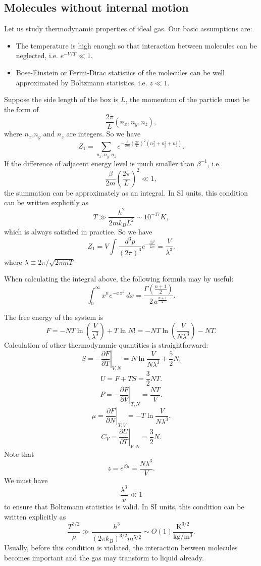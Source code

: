 \subsection{Molecules without internal motion}
Let us study thermodynamic properties of ideal gas. Our basic assumptions are:
\begin{itemize}
\item The temperature is high enough so that interaction between molecules can be neglected, i.e. $e^{-{V}/{T}} \ll 1$.
\item Bose-Einstein or Fermi-Dirac statistics of the molecules can be well approximated by Boltzmann statistics, i.e. $z \ll 1$.
\end{itemize}
Suppose the side length of the box is $L$, the momentum of the particle must be the form of
\[\frac{2\pi}{L}(n_x,n_y,n_z),\]
where $n_x$,$n_y$ and $n_z$ are integers. 
So we have
\[Z_1 = \sum_{n_x,n_y,n_z} e^{-\frac{\beta}{2m} (\frac{2\pi}{L})^2(n_x^2 + n_y^2 + n_z^2)}.\]
If the difference of adjacent energy level is much smaller than $\beta^{-1}$, i.e.
\[\frac{\beta}{2m} (\frac{2\pi}{L})^2 \ll 1,\] 
the summation can be approximately as an integral. 
In SI units, this condition can be written explicitly as
\[T \gg \frac{h^2}{2mk_BL^2} \sim 10^{-17}K,\] 
which is always satisfied in practice. 
So we have
\[Z_1 = V \int \frac{d^3p}{(2\pi)^3} e^{-\frac{\beta p^2}{2m}} = \frac{V}{\lambda^3}.\]
where $\lambda \equiv {2\pi}/{\sqrt{2\pi m T}}$
\begin{note}
When calculating the integral above, the following formula may by useful: 
\[\int _{0}^{\infty }x^{n}e^{-a\,x^{2}}\,dx={\frac {\Gamma ({\frac {n+1}{2}})}{2\,a^{\frac {n+1}{2}}}}.\]
\end{note}
\noindent
The free energy of the system is
\[F = -NT\ln(\frac{V}{\lambda^3}) + T\ln N! = -NT\ln(\frac{V}{N\lambda^3}) - NT.\]
Calculation of other thermodynamic quantities is straightforward:
\[S = -\left. \frac{\partial F}{\partial T} \right|_{V,N} = N \ln \frac{V}{N\lambda^3} + \frac{5}{2}N.\]
\[U = F + TS = \frac{3}{2}NT.\]
\[P = -\left. \frac{\partial F}{\partial V} \right|_{T,N} = \frac{NT}{V}.\]
\[\mu = \left. \frac{\partial F}{\partial N} \right|_{T,V} = -T \ln \frac{V}{N\lambda^3}.\]
\[C_V = \left. \frac{\partial U}{\partial T} \right|_{V,N} = \frac{3}{2}N.\]
Note that
\[z = e^{\beta \mu} = \frac{N\lambda^3}{V}.\]
We must have
\[\frac{\lambda^3}{v} \ll 1 \]
to ensure that Boltzmann statistics is valid. 
In SI units, this condition can be written explicitly as
\[\frac{T^{3/2}}{\rho} \gg \frac{h^3}{(2\pi k_B )^{3/2}m^{5/2}} \sim O(1) \frac{\mathrm{K^{3/2}}}{\mathrm{kg/m^3}}.\]
Usually, before this condition is violated, the interaction between molecules becomes important and the gas may transform to liquid already.

